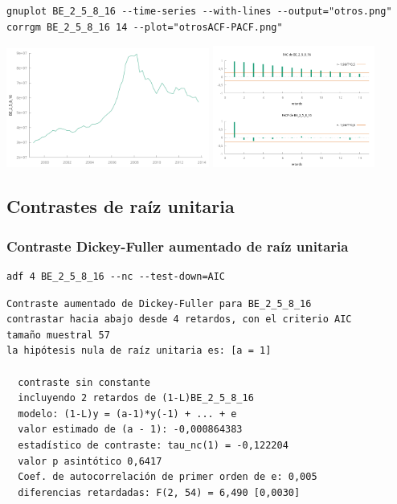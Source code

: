 \documentclass[10pt]{article}
\begin{document}
\begin{verbatim}
gnuplot BE_2_5_8_16 --time-series --with-lines --output="otros.png"
corrgm BE_2_5_8_16 14 --plot="otrosACF-PACF.png"
\end{verbatim}

\begin{center}
\includegraphics[width=0.5\textwidth]{./SerieCuentasFinancierasBE/otros.png} 
\includegraphics[width=0.4\textwidth]{./SerieCuentasFinancierasBE/otrosACF-PACF.png} 
\end{center}
\subsection*{Contrastes de raíz unitaria}
\label{sec:org5354606}
\subsubsection*{Contraste Dickey-Fuller aumentado de raíz unitaria}
\label{sec:org875f80d}

\begin{verbatim}
adf 4 BE_2_5_8_16 --nc --test-down=AIC
\end{verbatim}

\begin{verbatim}
Contraste aumentado de Dickey-Fuller para BE_2_5_8_16
contrastar hacia abajo desde 4 retardos, con el criterio AIC
tamaño muestral 57
la hipótesis nula de raíz unitaria es: [a = 1]

  contraste sin constante 
  incluyendo 2 retardos de (1-L)BE_2_5_8_16
  modelo: (1-L)y = (a-1)*y(-1) + ... + e
  valor estimado de (a - 1): -0,000864383
  estadístico de contraste: tau_nc(1) = -0,122204
  valor p asintótico 0,6417
  Coef. de autocorrelación de primer orden de e: 0,005
  diferencias retardadas: F(2, 54) = 6,490 [0,0030]
\end{verbatim}
\end{document}
